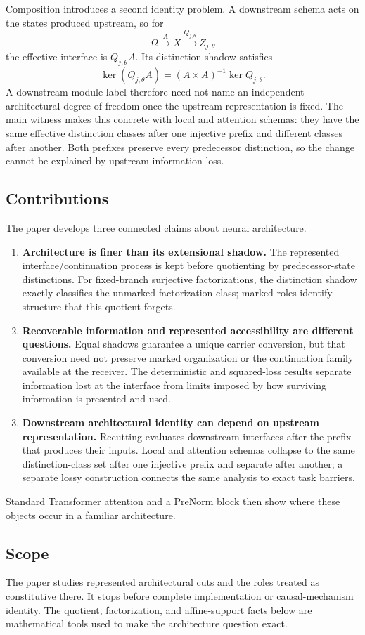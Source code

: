 Composition introduces a second identity problem. A downstream schema acts on the states produced upstream, so for
\[
\Omega\xrightarrow{A}X\xrightarrow{Q_{j,\theta}}Z_{j,\theta}
\]
the effective interface is $Q_{j,\theta}A$. Its distinction shadow satisfies
\[
\ker(Q_{j,\theta}A)=(A\times A)^{-1}\ker Q_{j,\theta}.
\]
A downstream module label therefore need not name an independent architectural degree of freedom once the upstream representation is fixed. The main witness makes this concrete with local and attention schemas: they have the same effective distinction classes after one injective prefix and different classes after another. Both prefixes preserve every predecessor distinction, so the change cannot be explained by upstream information loss.

\subsection{Contributions}

The paper develops three connected claims about neural architecture.

\begin{enumerate}[label=(\arabic*)]
\item \textbf{Architecture is finer than its extensional shadow.} The represented interface/continuation process is kept before quotienting by predecessor-state distinctions. For fixed-branch surjective factorizations, the distinction shadow exactly classifies the unmarked factorization class; marked roles identify structure that this quotient forgets.

\item \textbf{Recoverable information and represented accessibility are different questions.} Equal shadows guarantee a unique carrier conversion, but that conversion need not preserve marked organization or the continuation family available at the receiver. The deterministic and squared-loss results separate information lost at the interface from limits imposed by how surviving information is presented and used.

\item \textbf{Downstream architectural identity can depend on upstream representation.} Recutting evaluates downstream interfaces after the prefix that produces their inputs. Local and attention schemas collapse to the same distinction-class set after one injective prefix and separate after another; a separate lossy construction connects the same analysis to exact task barriers.
\end{enumerate}

Standard Transformer attention and a PreNorm block then show where these objects occur in a familiar architecture.

\subsection{Scope}

The paper studies represented architectural cuts and the roles treated as constitutive there. It stops before complete implementation or causal-mechanism identity. The quotient, factorization, and affine-support facts below are mathematical tools used to make the architecture question exact.
